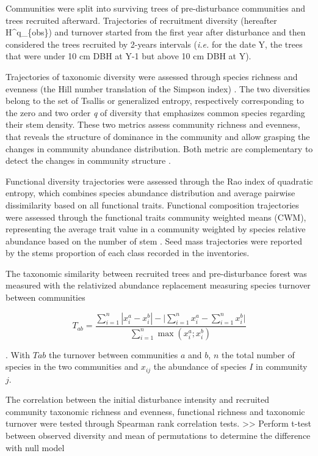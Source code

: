 \documentclass[fleqn,10pt]{ArtEcoFoG} %
\begin{document}
Communities were split into surviving trees of pre-disturbance
communities and trees recruited afterward. Trajectories of recruitment
diversity (hereafter H\^{}q\_\{obs\}) and turnover started from the
first year after disturbance and then considered the trees recruited by
2-years intervals (\emph{i.e.} for the date Y, the trees that were under
10 cm DBH at Y-1 but above 10 cm DBH at Y).

Trajectories of taxonomic diversity were assessed through species
richness and evenness (the Hill number translation of the Simpson index)
\citep{Chao2015, Marcon2015}. The two diversities belong to the set of
Tsallis or generalized entropy, respectively corresponding to the zero
and two order \emph{q} of diversity that emphasizes common species
regarding their stem density. These two metrics assess community
richness and evenness, that reveals the structure of dominance in the
community and allow grasping the changes in community abundance
distribution. Both metric are complementary to detect the changes in
community structure \citep{Magurran2004}.

Functional diversity trajectories were assessed through the Rao index of
quadratic entropy, which combines species abundance distribution and
average pairwise dissimilarity based on all functional traits.
Functional composition trajectories were assessed through the functional
traits community weighted means (CWM), representing the average trait
value in a community weighted by species relative abundance based on the
number of stem \citep{Diaz2007}. Seed mass trajectories were reported by
the stems proportion of each class recorded in the inventories.

The taxonomic similarity between recruited trees and pre-disturbance
forest was measured with the relativized abundance replacement measuring
species turnover between communities \citep{Podani2013a}

\begin{equation}
T_{ab}=\frac{\sum_{i=1}^{n}|x_i^a - x_i^b| - \bigg| \sum_{i=1}^{n}{x_i^a} - \sum_{i=1}^{n}{x_i^b} \bigg|}{\sum_{i=1}^{n}\max{\left( x_i^a;x_i^b \right)}}
\label{eq:formNestedness}
\end{equation}

. With \(Tab\) the turnover between communities \(a\) and \(b\), \(n\)
the total number of species in the two communities and \(x_{ij}\) the
abundance of species \(I\) in community \(j\).

The correlation between the initial disturbance intensity and recruited
community taxonomic richness and evenness, functional richness and
taxonomic turnover were tested through Spearman rank correlation tests.
\textgreater{}\textgreater{} Perform t-test between observed diversity
and mean of permutations to determine the difference with null model
\end{document}
